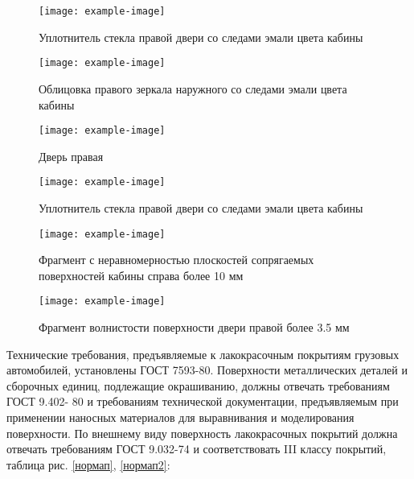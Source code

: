 {   
    \begin{figure}[H]\centering
   	\parbox[t]{0.49\textwidth}
   	{\centering
   		\texttt{[image: example-image]}
   		\caption{\footnotesize {Уплотнитель стекла правой двери со следами эмали цвета кабины}}
   		\label{уплотнительп}}
   	\hfil \hfil
   	\parbox[t]{0.49\textwidth}
   	{\centering
   		\texttt{[image: example-image]}
   		\caption{\footnotesize {Облицовка правого зеркала наружного со следами эмали цвета кабины}}
   		\label{облицовкаправогозеркала}}
   \end{figure}


 \begin{figure}[H]\centering
	\parbox[t]{0.49\textwidth}
	{\centering
		\texttt{[image: example-image]}
		\caption{\footnotesize {Дверь правая}}
		\label{дверьправая}}
	\hfil \hfil
	\parbox[t]{0.49\textwidth}
	{\centering
		\texttt{[image: example-image]}
		\caption{\footnotesize {Уплотнитель стекла правой двери со следами эмали цвета кабины}}
		\label{уплотнительсправа}}
\end{figure}

    \begin{figure}[H]\centering
   	\parbox[t]{0.49\textwidth}
   	{\centering
   		\texttt{[image: example-image]}
   		\caption{\footnotesize {Фрагмент с неравномерностью плоскостей сопрягаемых поверхностей кабины справа более 10 мм}}
   		\label{неравномерностьплоскости}}
   	\hfil \hfil
   	\parbox[t]{0.49\textwidth}
   	{\centering
   		\texttt{[image: example-image]}
   		\caption{\footnotesize {Фрагмент волнистости поверхности двери правой более 3.5 мм }}
   		\label{волнистость}}
   \end{figure}
   
   
   

   
Технические требования, предъявляемые к лакокрасочным покрытиям грузовых
автомобилей, установлены ГОСТ 7593-80. Поверхности металлических деталей и
сборочных единиц, подлежащие окрашиванию, должны отвечать требованиям ГОСТ 9.402-
80 и требованиям технической документации, предъявляемым при применении наносных
материалов для выравнивания и моделирования поверхности. По внешнему виду
поверхность лакокрасочных покрытий должна отвечать требованиям ГОСТ 9.032-74 и
соответствовать III классу покрытий, таблица рис. \ref{нормап}, \ref{нормап2}:

}
